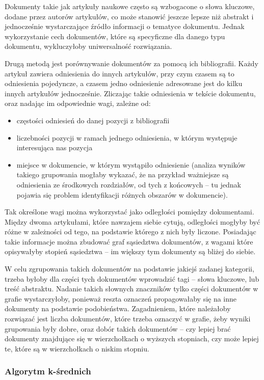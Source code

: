 \documentclass{article}
\begin{document}
Dokumenty takie jak artykuły naukowe często są wzbogacone o słowa kluczowe, dodane przez autorów artykułów, co może stanowić jeszcze lepsze niż abstrakt i jednocześnie wystarczające źródło informacji o tematyce dokumentu. Jednak wykorzystanie cech dokumentów, które są specyficzne dla danego typu dokumentu, wykluczyłoby uniwersalność rozwiązania.

Drugą metodą jest porównywanie dokumentów za pomocą ich bibliografii. Każdy artykuł zawiera odniesienia do innych artykułów, przy czym czasem są to odniesienia pojedyncze, a czasem jedno odniesienie adresowane jest do kilku innych artykułów jednocześnie. Zliczając takie odniesienia w tekście dokumentu, oraz nadając im odpowiednie wagi, zależne od:

\begin{itemize}
	\item częstości odniesień do danej pozycji z bibliografii
	\item liczebności pozycji w ramach jednego odniesienia, w którym występuje interesująca nas pozycja
	\item miejsce w dokumencie, w którym wystąpiło odniesienie (analiza wyników takiego grupowania mogłaby wykazać, że na przykład ważniejsze są odniesienia ze środkowych rozdziałów, od tych z końcowych – tu jednak pojawia się problem identyfikacji różnych obszarów w dokumencie).
\end{itemize}
Tak określone wagi można wykorzystać jako odległości pomiędzy dokumentami. Między dwoma artykułami, które nawzajem siebie cytują, odległości mogłyby być różne w zależności od tego, na podstawie którego z nich były liczone. Posiadając takie informacje można zbudować graf sąsiedztwa dokumentów, z wagami które opisywałyby stopień sąsiedztwa – im większy tym dokumenty są bliżej do siebie. 

W celu zgrupowania takich dokumentów na podstawie jakiejś zadanej kategorii, trzeba byłoby dla części tych dokumentów wprowadzić tagi – słowa kluczowe, lub treść abstraktu. Nadanie takich słownych znaczników tylko części dokumentów w grafie wystarczyłoby, ponieważ reszta oznaczeń propagowałaby się na inne dokumenty na podstawie podobieństwa. Zagadnieniem, które należałoby rozwiązać jest liczba dokumentów, które trzeba oznaczyć w grafie, żeby wyniki grupowania były dobre, oraz dobór takich dokumentów – czy lepiej brać dokumenty znajdujące się w wierzchołkach o wyższych stopniach, czy może lepiej te, które są w wierzchołkach o niskim stopniu.

\subsubsection{Algorytm k-średnich}
\end{document}
